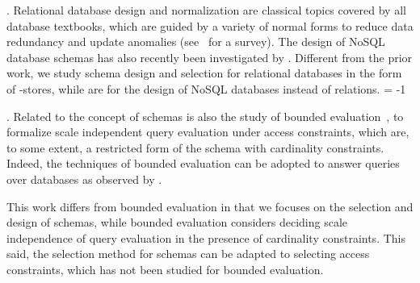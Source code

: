 .
Relational database design and normalization are classical topics
covered by all database textbooks, which are guided by a %
variety of
normal forms to reduce data redundancy and update anomalies
(see~\cite{DBSchema} for a survey). The design of NoSQL database
schemas has also recently been investigated by \eg
\cite{NoSQLschema1,NoSQLschema2}. Different from the
  prior work, we study
schema design and selection for relational databases in the
form of \kv-stores, while \cite{NoSQLschema1,NoSQLschema2} are
for the design of NoSQL databases instead of relations.
\looseness = -1




.
Related to the concept of \baav schemas is also the study of
bounded evaluation~\cite{PODS14,PODS15,SIGMOD16,PODS16}, to
formalize scale independent query evaluation under access
constraints, which are, to some extent, a restricted form of the
\baav schema with cardinality constraints. %
Indeed, the techniques of bounded evaluation can be adopted to answer
queries over \baav databases as observed by \cite{VLDB19}.

This work differs from bounded evaluation in that we focuses on
the selection and design of \baav schemas, while bounded
evaluation considers deciding scale independence of query
evaluation %
in the presence of cardinality constraints.
This said, the selection method for \baav schemas can be
  adapted to selecting access constraints, which has not been
  studied for bounded evaluation.


